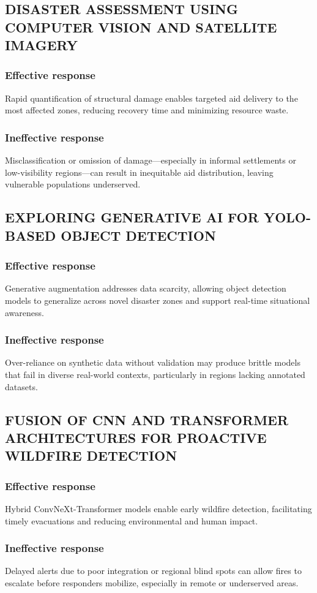 \documentclass[conference,a4paper]{IEEEtran}
\begin{document}
\subsection{DISASTER ASSESSMENT USING COMPUTER VISION AND SATELLITE IMAGERY}
\subsubsection{Effective response}
Rapid quantification of structural damage enables targeted aid delivery to the most affected zones, reducing recovery time and minimizing resource waste.
\subsubsection{Ineffective response}
Misclassification or omission of damage—especially in informal settlements or low-visibility regions—can result in inequitable aid distribution, leaving vulnerable populations underserved.
\subsection{EXPLORING GENERATIVE AI FOR YOLO-BASED OBJECT DETECTION}
\subsubsection{Effective response}
Generative augmentation addresses data scarcity, allowing object detection models to generalize across novel disaster zones and support real-time situational awareness.
\subsubsection{Ineffective response}
Over-reliance on synthetic data without validation may produce brittle models that fail in diverse real-world contexts, particularly in regions lacking annotated datasets.
\subsection{FUSION OF CNN AND TRANSFORMER ARCHITECTURES FOR PROACTIVE WILDFIRE DETECTION}
\subsubsection{Effective response}
Hybrid ConvNeXt-Transformer models enable early wildfire detection, facilitating timely evacuations and reducing environmental and human impact.
\subsubsection{Ineffective response}
Delayed alerts due to poor integration or regional blind spots can allow fires to escalate before responders mobilize, especially in remote or underserved areas.
\end{document}

